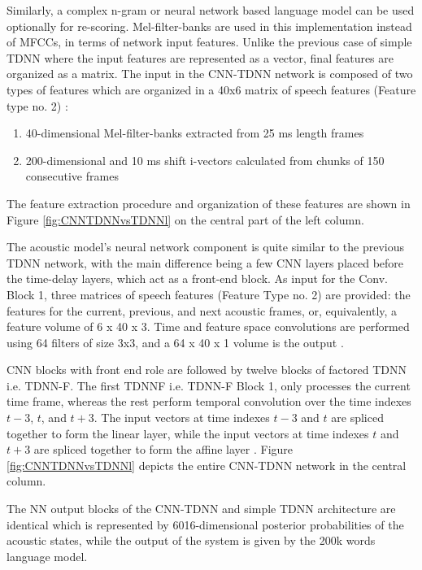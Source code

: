 Similarly, a complex n-gram or neural network based language model can be used optionally for re-scoring. Mel-filter-banks are used in this implementation instead of MFCCs, in terms of network input features. Unlike the previous case of simple TDNN where the input features are represented as a vector, final features are organized as a matrix. The input in the CNN-TDNN network is composed of two types of features which are organized in a 40x6 matrix of speech features (Feature type no. 2) \cite{georgescu_performance_2021}: 
\begin{enumerate}
    \item 40-dimensional Mel-filter-banks extracted from 25 ms length frames
    \item 200-dimensional and 10 ms shift i-vectors calculated from chunks of 150 consecutive frames
\end{enumerate}

The feature extraction procedure and organization of these features are shown in Figure \ref{fig:CNNTDNNvsTDNNl} on the central part of the left column.

The acoustic model's neural network component is quite similar to the previous TDNN network, with the main difference being a few CNN layers placed before the time-delay layers, which act as a front-end block. As input for the Conv. Block 1, three matrices of speech features (Feature Type no. 2) are provided: the features for the current, previous, and next acoustic frames, or, equivalently, a feature volume of 6 x 40 x 3. Time and feature space convolutions are performed using 64 filters of size 3x3, and a 64 x 40 x 1 volume is the output \cite{georgescu_performance_2021}.

CNN blocks with front end role are followed by twelve blocks of factored TDNN i.e. TDNN-F. The first TDNNF i.e. TDNN-F Block 1, only processes the current time frame, whereas the rest perform temporal convolution over the time indexes $t-3$, $t$, and $t+3$. The input vectors at time indexes $t-3$ and $t$ are spliced together to form the linear layer, while the input vectors at time indexes $t$ and $t+3$ are spliced together to form the affine layer \cite{abdel-hamid_convolutional_2014}. Figure \ref{fig:CNNTDNNvsTDNNl} depicts the entire CNN-TDNN network in the central column.  

The NN output blocks of the CNN-TDNN and simple TDNN architecture are identical which is represented by 6016-dimensional posterior probabilities of the acoustic states, while the output of the system is given by the 200k words language model. 

